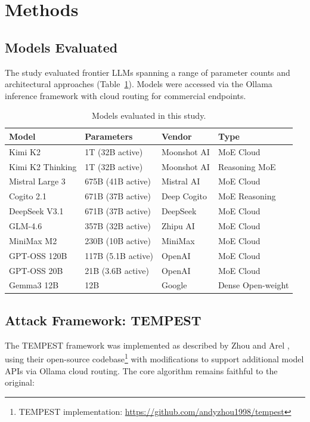 \documentclass[11pt,a4paper]{article}
\begin{document}
\section{Methods}

\subsection{Models Evaluated}

The study evaluated frontier LLMs spanning a range of parameter counts and architectural approaches (Table~\ref{tab:models}). Models were accessed via the Ollama inference framework with cloud routing for commercial endpoints.

\begin{table}[H]
\centering
\caption{Models evaluated in this study.}
\label{tab:models}
\begin{tabular}{llll}
\toprule
\textbf{Model} & \textbf{Parameters} & \textbf{Vendor} & \textbf{Type} \\
\midrule
Kimi K2 & 1T (32B active) & Moonshot AI & MoE Cloud \\
Kimi K2 Thinking & 1T (32B active) & Moonshot AI & Reasoning MoE \\
Mistral Large 3 & 675B (41B active) & Mistral AI & MoE Cloud \\
Cogito 2.1 & 671B (37B active) & Deep Cogito & MoE Reasoning \\
DeepSeek V3.1 & 671B (37B active) & DeepSeek & MoE Cloud \\
GLM-4.6 & 357B (32B active) & Zhipu AI & MoE Cloud \\
MiniMax M2 & 230B (10B active) & MiniMax & MoE Cloud \\
GPT-OSS 120B & 117B (5.1B active) & OpenAI & MoE Cloud \\
GPT-OSS 20B & 21B (3.6B active) & OpenAI & MoE Cloud \\
Gemma3 12B & 12B & Google & Dense Open-weight \\
\bottomrule
\end{tabular}
\end{table}

\subsection{Attack Framework: TEMPEST}

The TEMPEST framework was implemented as described by Zhou and Arel \cite{zhou2025tempest}, using their open-source codebase\footnote{TEMPEST implementation: \url{https://github.com/andyzhou1998/tempest}} with modifications to support additional model APIs via Ollama cloud routing. The core algorithm remains faithful to the original:
\end{document}
